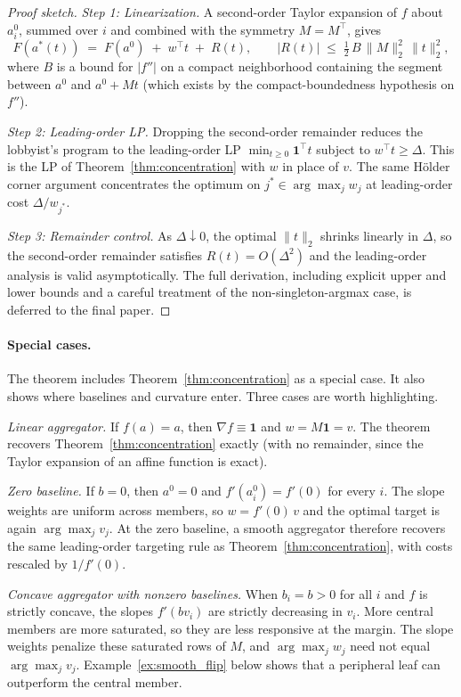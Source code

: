 \documentclass[11pt,letterpaper]{article}
\theoremstyle{plain}
\theoremstyle{definition}
\theoremstyle{remark}
\begin{document}
\begin{proof}[Proof sketch]
\emph{Step 1: Linearization.} A second-order Taylor expansion of $f$ about $a^0_i$, summed over $i$ and combined with the symmetry $M = M^\top$, gives
\[
F(a^*(t)) \;=\; F(a^0) \;+\; w^\top t \;+\; R(t), \qquad |R(t)| \;\leq\; \tfrac{1}{2}\, B\, \|M\|_2^2\, \|t\|_2^2,
\]
where $B$ is a bound for $|f''|$ on a compact neighborhood containing the segment between $a^0$ and $a^0 + Mt$ (which exists by the compact-boundedness hypothesis on $f''$).

\smallskip\noindent\emph{Step 2: Leading-order LP.} Dropping the second-order remainder reduces the lobbyist's program to the leading-order LP $\min_{t \geq 0} \mathbf{1}^\top t$ subject to $w^\top t \geq \Delta$. This is the LP of Theorem~\ref{thm:concentration} with $w$ in place of $v$. The same H\"older corner argument concentrates the optimum on $j^* \in \arg\max_j w_j$ at leading-order cost $\Delta / w_{j^*}$.

\smallskip\noindent\emph{Step 3: Remainder control.} As $\Delta \downarrow 0$, the optimal $\|t\|_2$ shrinks linearly in $\Delta$, so the second-order remainder satisfies $R(t) = O(\Delta^2)$ and the leading-order analysis is valid asymptotically. The full derivation, including explicit upper and lower bounds and a careful treatment of the non-singleton-argmax case, is deferred to the final paper.
\end{proof}

\paragraph{Special cases.} The theorem includes Theorem~\ref{thm:concentration} as a special case. It also shows where baselines and curvature enter. Three cases are worth highlighting.

\emph{Linear aggregator.} If $f(a) = a$, then $\nabla f \equiv \mathbf{1}$ and $w = M\mathbf{1} = v$. The theorem recovers Theorem~\ref{thm:concentration} exactly (with no remainder, since the Taylor expansion of an affine function is exact).

\emph{Zero baseline.} If $b = 0$, then $a^0 = 0$ and $f'(a^0_i) = f'(0)$ for every $i$. The slope weights are uniform across members, so $w = f'(0)\, v$ and the optimal target is again $\arg\max_j v_j$. At the zero baseline, a smooth aggregator therefore recovers the same leading-order targeting rule as Theorem~\ref{thm:concentration}, with costs rescaled by $1/f'(0)$.

\emph{Concave aggregator with nonzero baselines.} When $b_i = b > 0$ for all $i$ and $f$ is strictly concave, the slopes $f'(b v_i)$ are strictly decreasing in $v_i$. More central members are more saturated, so they are less responsive at the margin. The slope weights penalize these saturated rows of $M$, and $\arg\max_j w_j$ need not equal $\arg\max_j v_j$. Example~\ref{ex:smooth_flip} below shows that a peripheral leaf can outperform the central member.
\end{document}
